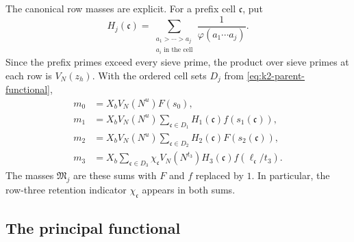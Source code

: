 The canonical row masses are explicit.
For a prefix cell \(\mathfrak c\), put
\[
 H_j(\mathfrak c)=
 \sum_{\substack{a_1>\cdots>a_j\\a_i\text{ in the cell}}}
       \frac1{\varphi(a_1\cdots a_j)}.
\]
Since the prefix primes exceed every sieve prime, the product over sieve
primes at each row is \(V_N(z_h)\). With the ordered cell sets
\(D_j\) from
\eqref{eq:k2-parent-functional},
\begin{equation}\label{eq:k2-row-main-masses}
\begin{aligned}
 m_0&=X_bV_N(N^u)F(s_0),\\
 m_1&=X_bV_N(N^u)\sum_{\mathfrak c\in D_1}
                 H_1(\mathfrak c)f(s_1(\mathfrak c)),\\
 m_2&=X_bV_N(N^u)\sum_{\mathfrak c\in D_2}
                 H_2(\mathfrak c)F(s_2(\mathfrak c)),\\
 m_3&=X_b\sum_{\mathfrak c\in D_3}\chi_{\mathfrak c}
       V_N(N^{t_3})H_3(\mathfrak c)f(\ell_{\mathfrak c}/t_3).
\end{aligned}
\end{equation}
The masses \(\mathfrak M_j\) are these sums with \(F\) and \(f\)
replaced by \(1\). In particular, the row-three retention indicator
\(\chi_{\mathfrak c}\) appears in both sums.


\subsection{The principal functional}

